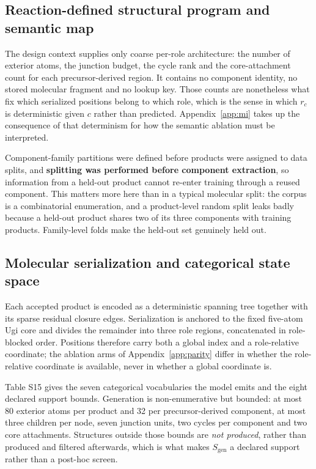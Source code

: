 \documentclass{article}
\newcounter{none}
\newcommand{\Sgen}{\ensuremath{S_{\mathrm{gen}}}}
\newcommand{\rolemap}{\ensuremath{r_c}}
\begin{document}
\subsection{Reaction-defined structural program and semantic map}
\label{app:program}
The design context supplies only coarse per-role architecture: the number of exterior atoms, the
junction budget, the cycle rank and the core-attachment count for each precursor-derived region. It
contains no component identity, no stored molecular fragment and no lookup key. Those counts are
nonetheless what fix which serialized positions belong to which role, which is the sense in which
\rolemap{} is deterministic given $c$ rather than predicted. Appendix~\ref{app:mi} takes up the
consequence of that determinism for how the semantic ablation must be interpreted.

Component-family partitions were defined before products were assigned to data splits, and
\textbf{splitting was performed before component extraction}, so information from a held-out product
cannot re-enter training through a reused component. This matters more here than in a typical
molecular split: the corpus is a combinatorial enumeration, and a product-level random split leaks
badly because a held-out product shares two of its three components with training products.
Family-level folds make the held-out set genuinely held out.

\subsection{Molecular serialization and categorical state space}
\label{app:state}
Each accepted product is encoded as a deterministic spanning tree together with its sparse residual
closure edges. Serialization is anchored to the fixed five-atom Ugi core and divides the remainder
into three role regions, concatenated in role-blocked order. Positions therefore carry both a global
index and a role-relative coordinate; the ablation arms of Appendix~\ref{app:parity} differ in
whether the role-relative coordinate is available, never in whether a global coordinate is.

Table S15 gives the seven categorical vocabularies the model emits and the eight declared support
bounds. Generation is non-enumerative but bounded: at most 80 exterior atoms per product and 32 per
precursor-derived component, at most three children per node, seven junction units, two cycles per
component and two core attachments. Structures outside those bounds are \emph{not produced}, rather
than produced and filtered afterwards, which is what makes \Sgen{} a declared support rather than a
post-hoc screen.
\end{document}
